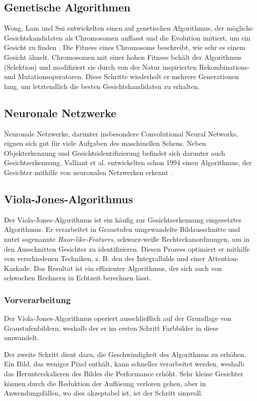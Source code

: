 \documentclass[doktyp=semarbeit, sprache=german]{TUBAFarbeiten}
\begin{document}
\subsection{Genetische Algorithmen}
Wong, Lam und Sui entwickelten einen auf genetischen Algorithmus, der mögliche Gesichtskandidaten als Chromosomen auffasst und die Evolution imitiert, um ein Gesicht zu finden \cite{WONG20011993}. Die Fitness eines Chromosoms beschreibt, wie sehr es einem Gesicht ähnelt. Chromosomen mit einer hohen Fitness behält der Algorithmus (\glqq Selektion\grqq) und modifiziert sie durch von der Natur inspirierten Rekombinations- und Mutationsoperatoren. Diese Schritte wiederholt er mehrere Generationen lang, um letztendlich die besten Gesichtskandidaten zu erhalten.

\subsection{Neuronale Netzwerke}
Neuronale Netzwerke, darunter insbesondere Convolutional Neural Networks, eignen sich gut für viele Aufgaben des maschinellen Sehens. Neben Objekterkennung und Gesichtsidentifizierung befindet sich darunter auch Gesichtserkennung. Valliant et al. entwickelten schon 1994 einen Algorithmus, der Gesichter mithilfe von neuronalen Netzwerken erkennt \cite{:/content/journals/10.1049/ip-vis_19941301}.

\subsection{Viola-Jones-Algorithmus}
Der Viola-Jones-Algorithmus ist ein häufig zur Gesichtserkennung eingesetzter Algorithmus. Er verarbeitet in Graustufen umgewandelte Bildausschnitte und nutzt sogenannte \textit{Haar-like-Features}, schwarz-weiße Rechteckanordnungen, um in den Ausschnitten Gesichter zu identifizieren. Diesen Prozess optimiert er mithilfe von verschiedenen Techniken, z. B. den des Integralbilds und einer Attention-Kaskade. Das Resultat ist ein effizienter Algorithmus, der sich auch von schwachen Rechnern in Echtzeit berechnen lässt.

\subsubsection{Vorverarbeitung}
Der Viola-Jones-Algorithmus operiert ausschließlich auf der Grundlage von Graustufenbildern, weshalb der er im ersten Schritt Farbbilder in diese umwandelt.

Der zweite Schritt dient dazu, die Geschwindigkeit des Algorithmus zu erhöhen. Ein Bild, das weniger Pixel enthält, kann schneller verarbeitet werden, weshalb das Herunterskalieren des Bildes die Performance erhöht. Sehr kleine Gesichter können durch die Reduktion der Auflösung verloren gehen, aber in Anwendungsfällen, wo dies akzeptabel ist, ist der Schritt sinnvoll.
\end{document}
